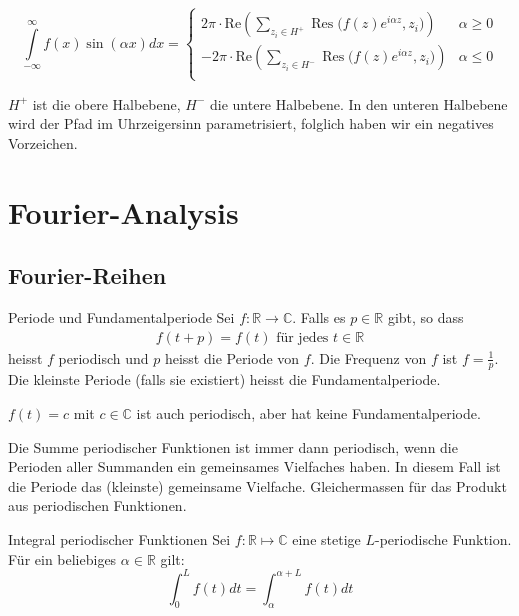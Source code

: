 \documentclass[a4paper,10pt]{article}
\DeclareMathOperator{\Res}{Res}
\def\R{\mathbb{R}}
\def\C{\mathbb{C}}
\begin{document}
  \[ \displaystyle \int\limits_{-\infty}^\infty f(x) \sin(\alpha x)dx = \begin{cases}
  \displaystyle 2\pi\cdot \text{Re}\left(\sum_{z_i \in H^+} \Res\big(f(z)e^{i\alpha z},  z_i\big) \right)
  &	\alpha \geqslant 0\\
  \displaystyle -2\pi\cdot \text{Re}\left(\sum_{z_i \in H^-} \Res\big(f(z)e^{i\alpha z},  z_i\big) \right)
  &	\alpha \leqslant 0\\
\end{cases} \]

$H^+$ ist die obere Halbebene, $H^-$ die untere Halbebene. In den unteren Halbebene wird der Pfad im Uhrzeigersinn parametrisiert, folglich haben wir ein negatives Vorzeichen.

\section{Fourier-Analysis}

\subsection{Fourier-Reihen}

\begin{subbox}{Periode und Fundamentalperiode}
  Sei \(f\colon\mathbb{R}\to\mathbb{C}\). Falls es \(p\in\mathbb{R}\) gibt, so dass \begin{align*}f(t+p)=f(t)\text{ für jedes }t\in\mathbb{R}\end{align*} heisst \(f\) periodisch und \(p\) heisst die Periode von \(f\). Die Frequenz von \(f\) ist $f=\frac{1}{p}$. Die kleinste Periode (falls sie existiert) heisst die Fundamentalperiode.
\end{subbox}

$f(t) = c$ mit $c \in \C$ ist auch periodisch, aber hat keine Fundamentalperiode.

Die Summe periodischer Funktionen ist immer dann periodisch, wenn die Perioden aller Summanden ein gemeinsames Vielfaches haben. In diesem Fall ist die Periode das (kleinste) gemeinsame Vielfache. Gleichermassen für das Produkt aus periodischen Funktionen.

\begin{subbox}{Integral periodischer Funktionen}
  Sei $f: \R \mapsto \C$ eine stetige $L$-periodische Funktion. Für ein beliebiges $\alpha \in \R$ gilt:
  $$
    \int_{0}^L f(t) dt = \int_{\alpha}^{\alpha + L} f(t) dt
  $$
\end{subbox}
\end{document}

